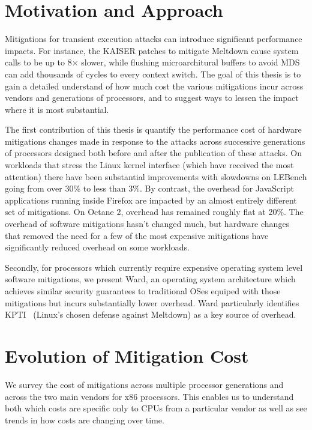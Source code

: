 \section{Motivation and Approach}
Mitigations for transient execution attacks can introduce significant performance impacts.
For instance, the KAISER patches to mitigate Meltdown cause system calls to be up to 8$\times$ slower, while flushing microarchitural buffers to avoid MDS can add thousands of cycles to every context switch.
The goal of this thesis is to gain a detailed understand of how much cost the various mitigations incur across vendors and generations of processors, and to suggest ways to lessen the impact where it is most substantial.

The first contribution of this thesis is quantify the performance cost of hardware mitigations changes made in response to the attacks across successive generations of processors designed both before and after the publication of these attacks.
On workloads that stress the Linux kernel interface (which have received the most attention) there have been substantial improvements with slowdowns on LEBench going from over 30\% to less than 3\%.
By contrast, the overhead for JavaScript applications running inside
Firefox are impacted by an almost entirely different set of
mitigations.
On Octane 2, overhead has remained roughly flat at 20\%.
The overhead of software mitigations hasn't changed much,
but hardware changes that removed the need for a
few of the most expensive mitigations have significantly reduced overhead on some workloads.


Secondly, for processors which currently require expensive operating system level software mitigations, we present Ward, an operating system architecture which achieves similar security guarantees to traditional OSes equiped with those mitigations but incurs substantially lower overhead. Ward particularly identifies KPTI~\cite{linux:kpti} (Linux's chosen defense against Meltdown) as a key source of overhead.

\section{Evolution of Mitigation Cost}
We survey the cost of mitigations across multiple processor generations and across the two main vendors for x86 processors.
This enables us to understand both which costs are specific only to CPUs from a particular vendor as well as see trends in how costs are changing over time.

